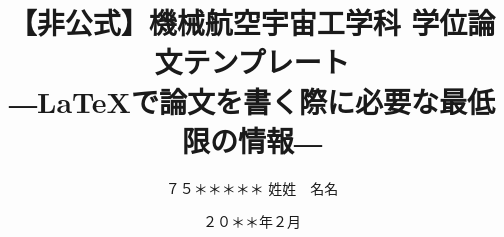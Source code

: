 \documentclass[
    paper=a4paper,      %
    report,             %
    fleqn,              %
    fontsize=12pt,      %
    jafontsize=12pt,    %
    head_space=33mm,    %
    foot_space=30mm,    %
    gutter=25mm,        %
    fore-edge=10mm,     %
    ]{jlreq}            %
\begin{document}


\title{【非公式】機械航空宇宙工学科 学位論文テンプレート\\ \――\LaTeX で論文を書く際に必要な最低限の情報\――}

\date{２０＊＊年２月}




\author{%
７５＊＊＊＊＊
\zw%
姓姓　名名
} %

\makecover

\tableofcontents



\clearpage
\pagestyle{normal}
\setcounter{page}{0}













\end{document}
